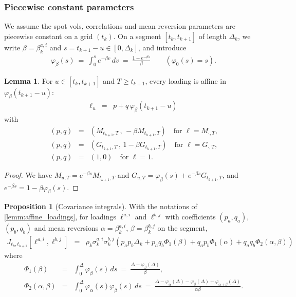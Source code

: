 \documentclass[11pt,english]{amsart}
\theoremstyle{definition}
\newtheorem{prop}{Proposition}
\newtheorem{lemm}{Lemma}
\begin{document}
\subsubsection{Piecewise constant parameters}
We assume the spot vols, correlations and mean reversion parameters are piecewise constant on a grid $(t_k)$. On a segment $[t_k,t_{k+1}]$ of length $\Delta_k$, we write $\beta = \beta^{a,i}_k$ and $s = t_{k+1}-u \in [0,\Delta_k]$, and introduce
\begin{eqnarray}
  \varphi_\beta(s) ~=~ \int_0^s e^{-\beta v}\,dv ~=~ \frac{1-e^{-\beta s}}{\beta} \qquad (\varphi_0(s) = s).
\end{eqnarray}

\begin{lemm}\label{lemm:affine_loadings}
For $u\in[t_k,t_{k+1}]$ and $T\ge t_{k+1}$, every loading is affine in $\varphi_\beta(t_{k+1}-u)$:
\begin{eqnarray}
  \ell_u &=& p + q\,\varphi_\beta(t_{k+1}-u)
\end{eqnarray}
with
\begin{eqnarray*}
  (p,q) &=& \left( M_{t_{k+1},T}\, ,\, -\beta M_{t_{k+1},T} \right) \quad \textrm{for $\ell = M_{\cdot,T}$,} \\
  (p,q) &=& \left( G_{t_{k+1},T}\, ,\, 1-\beta G_{t_{k+1},T} \right) \quad \textrm{for $\ell = G_{\cdot,T}$,} \\
  (p,q) &=& (1,0) \quad \textrm{for $\ell = 1$.}
\end{eqnarray*}
\end{lemm}

\begin{proof}
We have $M_{u,T} = e^{-\beta s} M_{t_{k+1},T}$ and $G_{u,T} = \varphi_\beta(s) + e^{-\beta s}G_{t_{k+1},T}$, and $e^{-\beta s} = 1-\beta\varphi_\beta(s)$.
\end{proof}

\begin{prop}[Covariance integrals]\label{prop:covariance_integrals}
With the notations of \autoref{lemm:affine_loadings}, for loadings $\ell^{a,i}$ and $\ell^{b,j}$ with coefficients $(p_a,q_a)$, $(p_b,q_b)$ and mean reversions $\alpha = \beta^{a,i}_k$, $\beta = \beta^{b,j}_k$ on the segment,
\begin{eqnarray}
  J_{t_k,t_{k+1}}\left[\ell^{a,i},\ell^{b,j}\right] &=& \rho_k \sigma^{a,i}_k\sigma^{b,j}_k \left( p_ap_b\Delta_k + p_aq_b\Phi_1(\beta) + q_ap_b\Phi_1(\alpha) + q_aq_b\Phi_2(\alpha,\beta) \right)
\end{eqnarray}
where
\begin{eqnarray}
  \Phi_1(\beta) &=& \int_0^{\Delta}\varphi_\beta(s)\,ds ~=~ \frac{\Delta - \varphi_\beta(\Delta)}{\beta} , \\
  \Phi_2(\alpha,\beta) &=& \int_0^{\Delta}\varphi_\alpha(s)\varphi_\beta(s)\,ds ~=~ \frac{\Delta - \varphi_\alpha(\Delta) - \varphi_\beta(\Delta) + \varphi_{\alpha+\beta}(\Delta)}{\alpha\beta} .
\end{eqnarray}
\end{prop}
\end{document}

